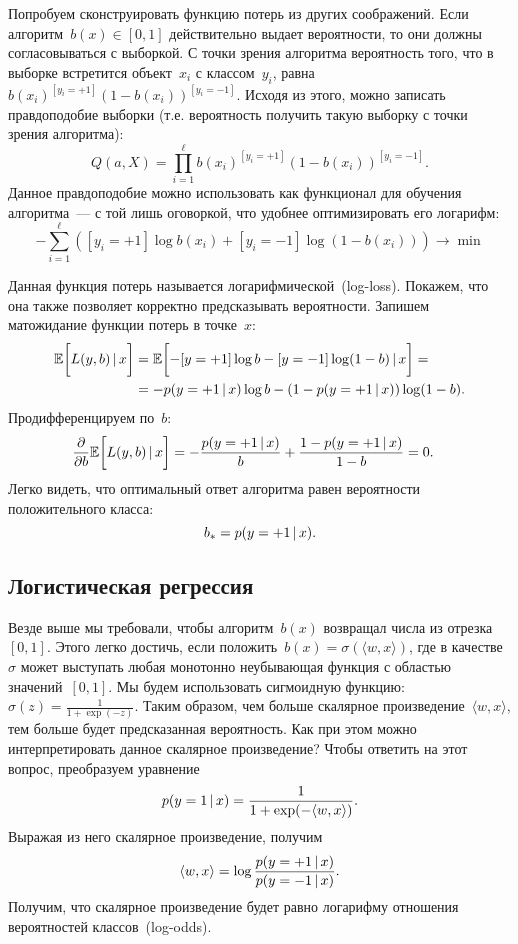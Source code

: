 \documentclass[12pt,fleqn]{article}
\begin{document}
Попробуем сконструировать функцию потерь из других соображений.
Если алгоритм~$b(x) \in [0, 1]$ действительно выдает вероятности, то
они должны согласовываться с выборкой.
С точки зрения алгоритма вероятность того, что в выборке встретится объект~$x_i$ с классом~$y_i$,
равна~$b(x_i)^{[y_i = +1]} (1 - b(x_i))^{[y_i = -1]}$.
Исходя из этого, можно записать правдоподобие выборки (т.е. вероятность получить такую выборку
с точки зрения алгоритма):
\[
    Q(a, X)
    =
    \prod_{i = 1}^{\ell}
        b(x_i)^{[y_i = +1]} (1 - b(x_i))^{[y_i = -1]}.
\]
Данное правдоподобие можно использовать как функционал для обучения алгоритма~---
с той лишь оговоркой, что удобнее оптимизировать его логарифм:
\[
    -\sum_{i = 1}^{\ell} \left(
        [y_i = +1] \log b(x_i)
        +
        [y_i = -1] \log (1 - b(x_i))
    \right)
    \to
    \min
\]

Данная функция потерь называется логарифмической~(log-loss).
Покажем, что она также позволяет корректно предсказывать вероятности.
Запишем матожидание функции потерь в точке~$x$:
\begin{align*}
    \mathbb{E} \biggl[
        L(y, b)
        \mspace{3mu}{|}\mspace{3mu}
        x
    \biggr]
    &=
    \mathbb{E} \biggl[
        -[y = +1] \log b - [y = -1] \log(1 - b)
        \mspace{3mu}{|}\mspace{3mu}
        x
    \biggr]
    =\\
    &=
    -p(y = +1 \mspace{3mu}{|}\mspace{3mu} x) \log b
    -
    (1 - p(y = +1 \mspace{3mu}{|}\mspace{3mu} x)) \log(1 - b).
\end{align*}
Продифференцируем по~$b$:
\begin{align*}
    \frac{\partial}{\partial b}
    \mathbb{E} \biggl[
        L(y, b)
        \mspace{3mu}{|}\mspace{3mu}
        x
    \biggr]
    &=
    -\frac{p(y = +1 \mspace{3mu}{|}\mspace{3mu} x)}{b} + \frac{1 - p(y = +1 \mspace{3mu}{|}\mspace{3mu} x)}{1 - b}
    =
    0.
\end{align*}
Легко видеть, что оптимальный ответ алгоритма равен вероятности положительного класса:
\[
    b_* = p(y = +1 \mspace{3mu}{|}\mspace{3mu} x).
\]

\subsection{Логистическая регрессия}
Везде выше мы требовали, чтобы алгоритм~$b(x)$ возвращал числа из отрезка~$[0, 1]$.
Этого легко достичь, если положить~$b(x) = \sigma(\langle w, x \rangle)$,
где в качестве~$\sigma$ может выступать любая монотонно неубывающая функция
с областью значений~$[0, 1]$.
Мы будем использовать сигмоидную функцию: $\sigma(z) = \frac{1}{1 + \exp(-z)}$.
Таким образом, чем больше скалярное произведение~$\langle w, x \rangle$,
тем больше будет предсказанная вероятность.
Как при этом можно интерпретировать данное скалярное произведение?
Чтобы ответить на этот вопрос, преобразуем уравнение
\[
    p(y = 1 \mspace{3mu}{|}\mspace{3mu} x)
    =
    \frac{1}{1 + \exp(-\langle w, x \rangle)}.
\]
Выражая из него скалярное произведение, получим
\[
    \langle w, x \rangle
    =
    \log
    \frac{
        p(y = +1 \mspace{3mu}{|}\mspace{3mu} x)
    }{
        p(y = -1 \mspace{3mu}{|}\mspace{3mu} x)
    }.
\]
Получим, что скалярное произведение будет равно логарифму отношения
вероятностей классов~(log-odds).
\end{document}

